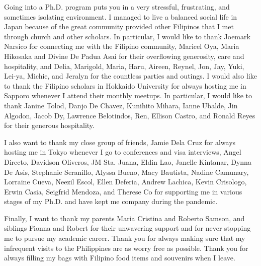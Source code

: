 Going into a Ph.D. program puts you in a very stressful, frustrating, and sometimes isolating environment. I managed to live a balanced social life in Japan because of the great community provided other Filipinos that I met through church and other scholars. In particular, I would like to thank Joemark Narsico for connecting me with the Filipino community, Maricel Oya, Maria Hikosaka and Divine De Padua Asai for their overflowing generosity, care and hospitality, and Delia, Marigold, Maria, Haru, Aireen, Reynel, Jon, Jay, Yuki, Lei-ya, Michie, and Jeralyn for the countless parties and outings. I would also like to thank the Filipino scholars in Hokkaido University for always hosting me in Sapporo whenever I attend their monthly meetups. In particular, I would like to thank Janine Tolod, Danjo De Chavez, Kunihito Mihara, Ianne Ubalde, Jin Algodon, Jacob Dy, Lawrence Belotindos, Ren, Ellison Castro, and Ronald Reyes for their generous hospitality.

I also want to thank my close group of friends, Jamie Dela Cruz for always hosting me in Tokyo whenever I go to conferences and visa interviews, Angel Directo, Davidson Oliveros, JM Sta. Juana, Eldin Lao, Janelle Kintanar, Dynna De Asis, Stephanie Seranillo, Alyssa Bueno, Macy Bautista, Nadine Camunary, Lorraine Cueva, Neezil Escol, Ellen Deferia, Andrew Lachica, Kevin Crisologo, Erwin Casia, Seigfrid Mendoza, and Therese Co for supporting me in various stages of my Ph.D. and have kept me company during the pandemic. 

Finally, I want to thank my parents Maria Cristina and Roberto Samson, and siblings Fionna and Robert for their unwavering support and for never stopping me to pursue my academic career. Thank you for always making sure that my infrequent visits to the Philippines are as worry free as possible. Thank you for always filling my bags with Filipino food items and souvenirs when I leave. 